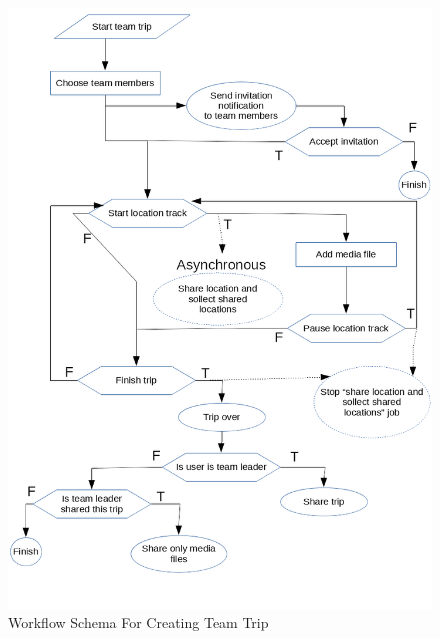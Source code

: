 \begin{figure}[!htbp]
\centering
\includegraphics[width=\textwidth]{projectChapters/images/teamTripWorkflow.png}
\caption{Workflow Schema For Creating Team Trip}
\label{fig:teamTripWorkflow}
\end{figure}